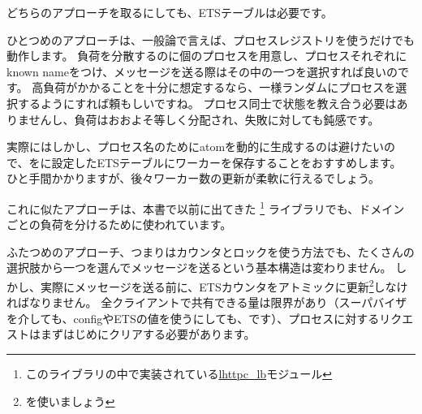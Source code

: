 どちらのアプローチを取るにしても、ETSテーブルは必要です。

ひとつめのアプローチは、一般論で言えば、プロセスレジストリを使うだけでも動作します。
負荷を分散するのに個のプロセスを用意し、プロセスそれぞれにknown nameをつけ、メッセージを送る際はその中の一つを選択すれば良いのです。
高負荷がかかることを十分に想定するなら、一様ランダムにプロセスを選択するようにすれば頼もしいですね。
プロセス同士で状態を教え合う必要はありませんし、負荷はおおよそ等しく分配され、失敗に対しても鈍感です。

実際にはしかし、プロセス名のためにatomを動的に生成するのは避けたいので、をに設定したETSテーブルにワーカーを保存することをおすすめします。
ひと手間かかりますが、後々ワーカー数の更新が柔軟に行えるでしょう。

これに似たアプローチは、本書で以前に出てきた \footnote{このライブラリの中で実装されている\href{https://github.com/ferd/lhttpc/blob/master/src/lhttpc\_lb.erl}{lhttpc\_lb}モジュール} ライブラリでも、ドメインごとの負荷を分けるために使われています。

ふたつめのアプローチ、つまりはカウンタとロックを使う方法でも、たくさんの選択肢から一つを選んでメッセージを送るという基本構造は変わりません。
しかし、実際にメッセージを送る前に、ETSカウンタをアトミックに更新\footnote{を使いましょう}しなければなりません。
全クライアントで共有できる量は限界があり（スーパバイザを介しても、configやETSの値を使うにしても、です）、プロセスに対するリクエストはまずはじめにクリアする必要があります。

